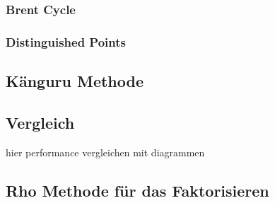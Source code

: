 \documentclass{scrartcl}
\begin{document}

\subsubsection{Brent Cycle}
\label{sec:brent_cycle}

\cite{Brent1980}

\subsubsection{Distinguished Points}
\label{sec:distinguished_points}


\cite{VanOorschot1999}

\subsection{Känguru Methode}
\label{sec:kaenguru}

\subsection{Vergleich}

hier performance vergleichen mit diagrammen

\subsection{Rho Methode für das Faktorisieren}
\label{sec:rho_faktorisieren}

\newpage
\printbibliography[heading=bibintoc]
\end{document}
